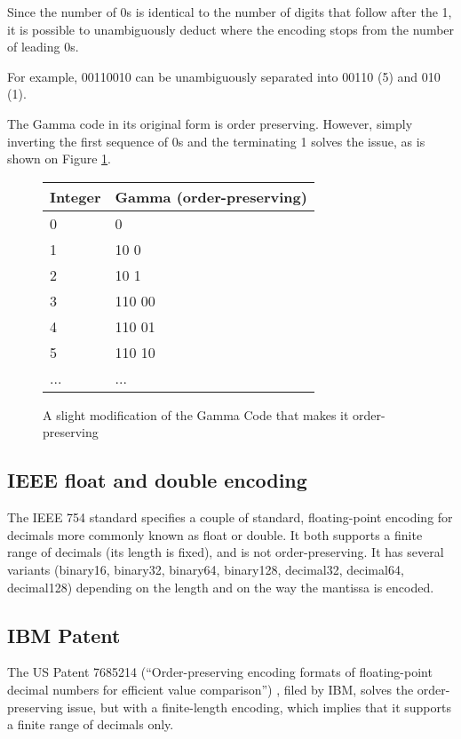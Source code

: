 \documentclass{acm_proc_article-sp}
\begin{document}
Since the number of 0s is identical to the number of digits that follow after the 1, it is possible to unambiguously deduct where the encoding stops from the number of leading 0s.

For example, 00110010 can be unambiguously separated into 00110 (5) and 010 (1).

The Gamma code in its original form is order preserving. However, simply inverting the first sequence of 0s and the terminating 1 solves the issue, as is shown on Figure \ref{figure-gamma-encoding-tweaked}.

\begin{figure}
\caption{A slight modification of the Gamma Code that makes it order-preserving}
\label{figure-gamma-encoding-tweaked}
\center
\begin{tabular}{|l|l|}
\hline
Integer & Gamma (order-preserving) \\
\hline
0 & 0 \\
\hline
1 & 10 0  \\
\hline
2 & 10 1  \\
\hline
3 & 110 00 \\
\hline
4 & 110 01 \\
\hline
5 & 110 10 \\
\hline
... & ... \\
\hline
\end{tabular}
\end{figure}


\subsection{IEEE float and double encoding}

The IEEE 754 standard specifies a couple of standard, floating-point encoding for decimals more commonly known as float or double. It both supports a finite range of decimals (its length is fixed), and is not order-preserving. It has several variants (binary16, binary32, binary64, binary128, decimal32, decimal64, decimal128) depending on the length and on the way the mantissa is encoded.

\subsection{IBM Patent}
The US Patent 7685214 (``Order-preserving encoding formats of floating-point decimal numbers for efficient value comparison'') , filed by IBM, solves the order-preserving issue, but with a finite-length encoding, which implies that it supports a finite range of decimals only.
\end{document}
